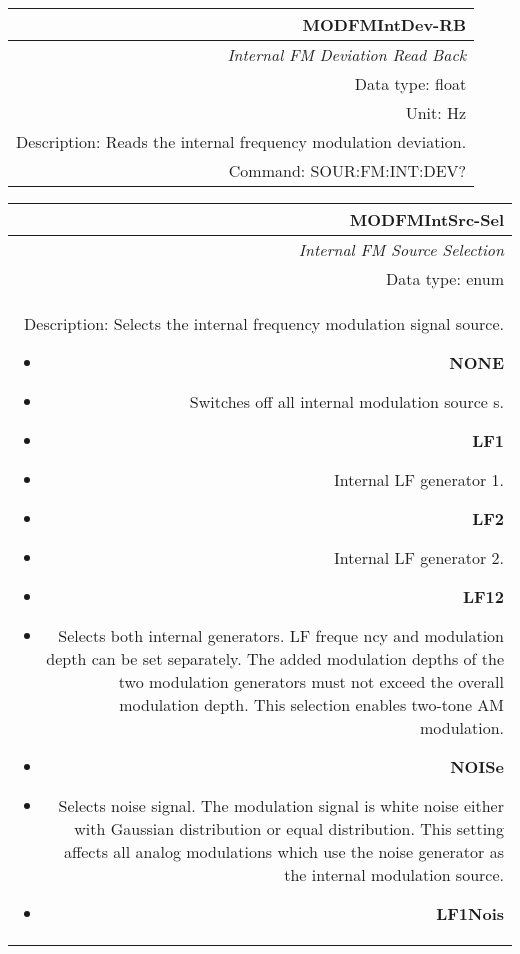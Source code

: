 \documentclass[openany]{article}
\begin{document}
		\begin{tabular}{N}
			\hline
			\bfseries MODFMIntDev-RB \\ \hline
			\emph{Internal FM Deviation Read Back} \\
			Data type: float \\
			Unit: Hz \\
			Description: Reads the internal frequency modulation deviation. \\
			Command: SOUR:FM:INT:DEV? \\

		\end{tabular}
%
		\begin{tabular}{N}
			\hline
			\bfseries MODFMIntSrc-Sel \\ \hline
			\emph{Internal FM Source Selection} \\
			Data type: enum \\  
			Description: Selects the internal frequency modulation signal source.\begin{itemize}[noitemsep]
				\small
				\item[] \textbf{NONE}
                                \item[] Switches off all internal modulation source     s.
                                \item[] \textbf{LF1}
                                \item[] Internal LF generator 1.
                                \item[] \textbf{LF2}
                                \item[] Internal LF generator 2.
                                \item[] \textbf{LF12}
                                \item[] Selects both internal generators. LF freque     ncy and modulation depth can be set separately. The added modulation depths of the two modulation generators must not exceed the overall modulation depth. This selection enables two-tone AM modulation.
                                \item[] \textbf{NOISe}
                                \item[] Selects noise signal. The modulation signal      is white noise either with Gaussian distribution or equal distribution. This setting affects all analog modulations which use the noise generator as the internal modulation source.
                                \item[] \textbf{LF1Nois}

\end{itemize}
\end{tabular}
\end{document}
